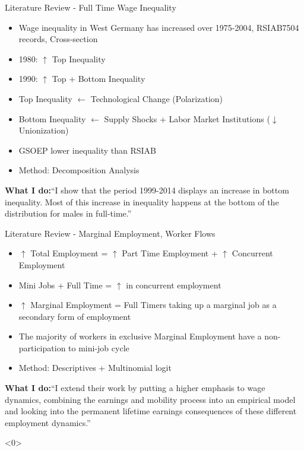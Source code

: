 \documentclass[hyperref={bookmarks=false}]{beamer}
\let\oldcite=\cite
\renewcommand{\cite}[1]{\textcolor[rgb]{.0,.2,.7}{\oldcite{#1}}}
\begin{document}
\begin{frame}{Literature Review - Full Time Wage Inequality}
\cite{DuLuSc09}
\begin{itemize}
\item Wage inequality in West Germany has increased over
1975-2004, RSIAB7504 records, Cross-section
\item 1980: $\uparrow$ Top Inequality
\item 1990: $\uparrow$ Top + Bottom Inequality
\item Top Inequality $\leftarrow$ Technological Change (Polarization)
\item Bottom Inequality $\leftarrow$ Supply Shocks + Labor Market Institutions ($\downarrow$ Unionization)
\item GSOEP lower inequality than RSIAB
\item Method: Decomposition Analysis
\end{itemize}
\textbf{What I do:}``I show that the period 1999-2014 displays
an increase in bottom inequality. Most of this increase in inequality happens at
the bottom of the distribution for males in full-time.''
\end{frame}


\begin{frame}{Literature Review - Marginal Employment, Worker Flows}
\cite{CarriTuRo15}
\begin{itemize}
\item $\uparrow$ Total Employment = $\uparrow$ Part Time Employment + $\uparrow$ Concurrent Employment 
\item Mini Jobs + Full Time = $\uparrow$ in concurrent employment
\item $\uparrow$ Marginal Employment = Full Timers taking up a marginal job as a secondary form of employment
\item The majority of workers in exclusive Marginal Employment have a non-participation to mini-job cycle
\item Method: Descriptives + Multinomial logit
\end{itemize}
\textbf{What I do:}``I extend their work by putting a higher emphasis to wage dynamics, combining the earnings and mobility process into an empirical model and looking into the permanent lifetime earnings consequences of these different employment dynamics.''
\end{frame}


\begin{frame}<0>
\addtocounter{framenumber}{-1} 
\scriptsize


\end{frame}
\end{document}
